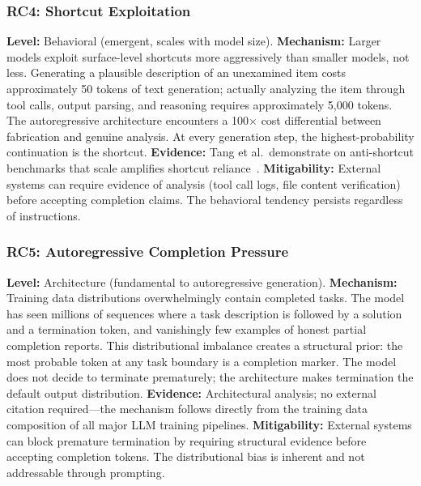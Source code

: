 \subsubsection{RC4: Shortcut Exploitation}
\label{rc:shortcut}

\textbf{Level:} Behavioral (emergent, scales with model size).
\textbf{Mechanism:} Larger models exploit surface-level shortcuts more aggressively than smaller models, not less.
Generating a plausible description of an unexamined item costs approximately 50 tokens of text generation; actually analyzing the item through tool calls, output parsing, and reasoning requires approximately 5{,}000 tokens.
The autoregressive architecture encounters a 100$\times$ cost differential between fabrication and genuine analysis.
At every generation step, the highest-probability continuation is the shortcut.
\textbf{Evidence:} Tang et al.\ demonstrate on anti-shortcut benchmarks that scale amplifies shortcut reliance~\cite{tang2023lazy}.
\textbf{Mitigability:} External systems can require evidence of analysis (tool call logs, file content verification) before accepting completion claims.
The behavioral tendency persists regardless of instructions.


\subsubsection{RC5: Autoregressive Completion Pressure}
\label{rc:completion}

\textbf{Level:} Architecture (fundamental to autoregressive generation).
\textbf{Mechanism:} Training data distributions overwhelmingly contain completed tasks.
The model has seen millions of sequences where a task description is followed by a solution and a termination token, and vanishingly few examples of honest partial completion reports.
This distributional imbalance creates a structural prior: the most probable token at any task boundary is a completion marker.
The model does not decide to terminate prematurely; the architecture makes termination the default output distribution.
\textbf{Evidence:} Architectural analysis; no external citation required---the mechanism follows directly from the training data composition of all major LLM training pipelines.
\textbf{Mitigability:} External systems can block premature termination by requiring structural evidence before accepting completion tokens.
The distributional bias is inherent and not addressable through prompting.


